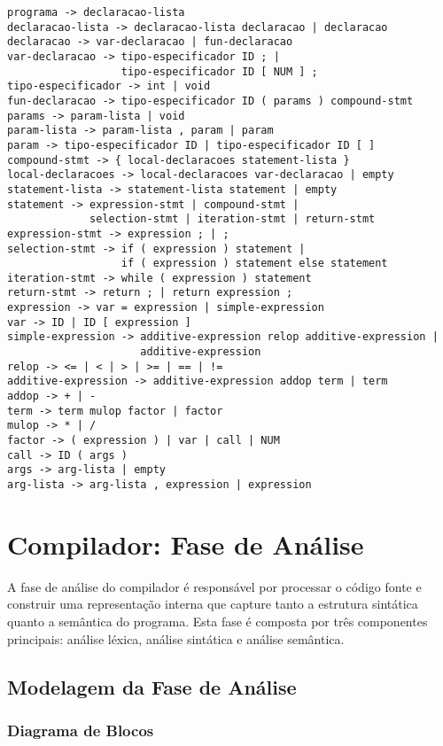 \documentclass[
	12pt,				%
	oneside,
	a4paper,			%
	english,			%
	french,				%
	spanish,			%
	brazil,				%
	]{abntex2}
\begin{document}
\begin{lstlisting}[style=cstyle, caption=Gramática BNF da Linguagem C-]
programa -> declaracao-lista
declaracao-lista -> declaracao-lista declaracao | declaracao
declaracao -> var-declaracao | fun-declaracao
var-declaracao -> tipo-especificador ID ; | 
                  tipo-especificador ID [ NUM ] ;
tipo-especificador -> int | void
fun-declaracao -> tipo-especificador ID ( params ) compound-stmt
params -> param-lista | void
param-lista -> param-lista , param | param
param -> tipo-especificador ID | tipo-especificador ID [ ]
compound-stmt -> { local-declaracoes statement-lista }
local-declaracoes -> local-declaracoes var-declaracao | empty
statement-lista -> statement-lista statement | empty
statement -> expression-stmt | compound-stmt | 
             selection-stmt | iteration-stmt | return-stmt
expression-stmt -> expression ; | ;
selection-stmt -> if ( expression ) statement | 
                  if ( expression ) statement else statement
iteration-stmt -> while ( expression ) statement
return-stmt -> return ; | return expression ;
expression -> var = expression | simple-expression
var -> ID | ID [ expression ]
simple-expression -> additive-expression relop additive-expression |
                     additive-expression
relop -> <= | < | > | >= | == | !=
additive-expression -> additive-expression addop term | term
addop -> + | -
term -> term mulop factor | factor
mulop -> * | /
factor -> ( expression ) | var | call | NUM
call -> ID ( args )
args -> arg-lista | empty
arg-lista -> arg-lista , expression | expression
\end{lstlisting}

\chapter{Compilador: Fase de Análise}

A fase de análise do compilador é responsável por processar o código fonte e construir uma representação interna que capture tanto a estrutura sintática quanto a semântica do programa. Esta fase é composta por três componentes principais: análise léxica, análise sintática e análise semântica.

\section{Modelagem da Fase de Análise}

\subsection{Diagrama de Blocos}
\end{document}
